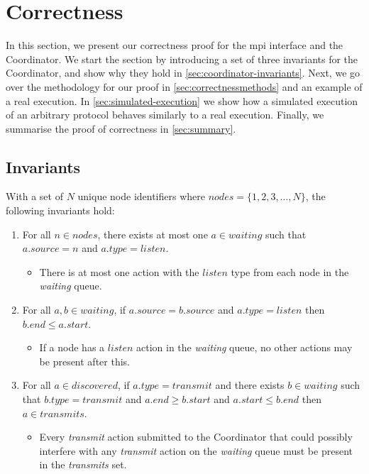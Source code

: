 \section{Correctness}\label{sec:correctness}
In this section, we present our correctness proof for the \gls{mpi} interface and the Coordinator. We start
the section by introducing a set of three invariants for the Coordinator, and show why they hold in
\autoref{sec:coordinator-invariants}. Next, we go over the methodology for our proof in
\autoref{sec:correctnessmethods} and an example of a real execution. In
\autoref{sec:simulated-execution} we show how a simulated execution of an arbitrary protocol behaves similarly
to a real execution. Finally, we summarise the proof of correctness in \autoref{sec:summary}.

\subsection{Invariants}\label{sec:coordinator-invariants}

With a set of $N$ unique node identifiers where $\mathit{nodes} = \{ 1, 2, 3, \ldots, N \}$, the following
invariants hold:

\begin{enumerate}
    \item For all $n \in \mathit{nodes}$, there exists at most one $a \in \mathit{waiting}$ such that
          $a.\mathit{source} = n$ and $a.\mathit{type} = \mathit{listen}$.
          \begin{itemize}
              \item There is at most one action with the $\mathit{listen}$ type from each node in the
                    \textit{waiting} queue.
          \end{itemize}
    \item For all $a, b \in \mathit{waiting}$, if $a.\mathit{source} = b.\mathit{source}$ and $a.\mathit{type}
              = \mathit{listen}$ then $b.\mathit{end} \leq a.\mathit{start}$.
          \begin{itemize}
              \item If a node has a $\mathit{listen}$ action in the \textit{waiting} queue, no other actions
                    may be present after this.
          \end{itemize}
    \item For all $a \in \mathit{discovered}$, if $a.\mathit{type} = \mathit{transmit}$ and there exists $b
              \in \mathit{waiting}$ such that $b.\mathit{type} = \mathit{transmit}$ and $a.\mathit{end} \geq
              b.\mathit{start}$ and $a.\mathit{start} \leq b.\mathit{end}$ then $a \in \mathit{transmits}$.
          \begin{itemize}
              \item Every \textit{transmit} action submitted to the Coordinator that could possibly interfere
                    with any \textit{transmit} action on the \textit{waiting} queue must be present in the
                    \textit{transmits} set.
          \end{itemize}
\end{enumerate}

